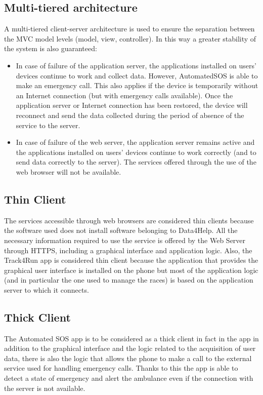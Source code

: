 \subsection{Multi-tiered architecture}
A multi-tiered client-server architecture is used to ensure the separation between the MVC model levels (model, view, controller).
In this way a greater stability of the system is also guaranteed:
\begin{itemize}
  \item In case of failure of the application server, the applications installed on users' devices continue to work and collect data. However, AutomatedSOS is able to make an emergency call. This also applies if the device is temporarily without an Internet connection (but with emergency calls available). Once the application server or Internet connection has been restored, the device will reconnect and send the data collected during the period of absence of the service to the server.
  \item In case of failure of the web server, the application server remains active and the applications installed on users' devices continue to work correctly (and to send data correctly to the server). The services offered through the use of the web browser will not be available.
\end{itemize}

\subsection{Thin Client}
The services accessible through web browsers are considered thin clients because the software used does not install software belonging to Data4Help.
All the necessary information required to use the service is offered by the Web Server through HTTPS, including a graphical interface and application logic.
Also, the Track4Run app is considered thin client because the application that provides the graphical user interface is installed on the phone but most of the application logic (and in particular the one used to manage the races) is based on the application server to which it connects.

\subsection{Thick Client}
The Automated SOS app is to be considered as a thick client in fact in the app in addition to the graphical interface and the logic related to the acquisition of user data, there is also the logic that allows the phone to make a call to the external service used for handling emergency calls.
Thanks to this the app is able to detect a state of emergency and alert the ambulance even if the connection with the server is not available.

